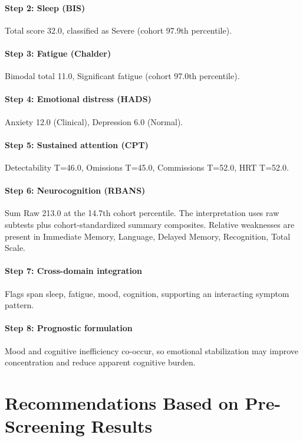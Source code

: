 \documentclass[11pt,a4paper]{article}
\begin{document}
\paragraph{Step 2: Sleep (BIS)}
Total score 32.0, classified as Severe (cohort 97.9th percentile).

\paragraph{Step 3: Fatigue (Chalder)}
Bimodal total 11.0, Significant fatigue (cohort 97.0th percentile).

\paragraph{Step 4: Emotional distress (HADS)}
Anxiety 12.0 (Clinical), Depression 6.0 (Normal).

\paragraph{Step 5: Sustained attention (CPT)}
Detectability T=46.0, Omissions T=45.0, Commissions T=52.0, HRT T=52.0.

\paragraph{Step 6: Neurocognition (RBANS)}
Sum Raw 213.0 at the 14.7th cohort percentile. The interpretation uses raw subtests plus cohort-standardized summary composites. Relative weaknesses are present in Immediate Memory, Language, Delayed Memory, Recognition, Total Scale.

\paragraph{Step 7: Cross-domain integration}
Flags span sleep, fatigue, mood, cognition, supporting an interacting symptom pattern.

\paragraph{Step 8: Prognostic formulation}
Mood and cognitive inefficiency co-occur, so emotional stabilization may improve concentration and reduce apparent cognitive burden.



\section{Recommendations Based on Pre-Screening Results}
\end{document}
